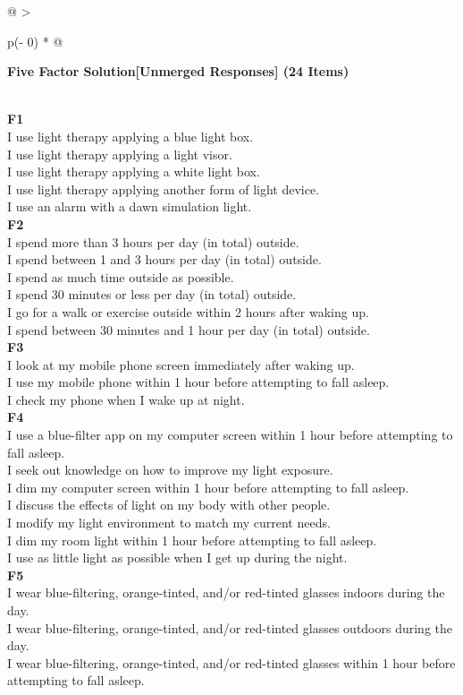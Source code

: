 \begin{appendix}
\begin{longtable}[]{@{}
  >{\raggedright\arraybackslash}p{(\columnwidth - 0\tabcolsep) * }@{}}
\toprule
\begin{minipage}[b]{\linewidth}\raggedright
\textbf{Five Factor Solution{[}Unmerged Responses{]} (24 Items)}
\end{minipage} \\
\midrule
\endhead
\textbf{F1} \\
I use light therapy applying a blue light box. \\
I use light therapy applying a light visor. \\
I use light therapy applying a white light box. \\
I use light therapy applying another form of light device. \\
I use an alarm with a dawn simulation light. \\
\textbf{F2} \\
I spend more than 3 hours per day (in total) outside. \\
I spend between 1 and 3 hours per day (in total) outside. \\
I spend as much time outside as possible. \\
I spend 30 minutes or less per day (in total) outside. \\
I go for a walk or exercise outside within 2 hours after waking up. \\
I spend between 30 minutes and 1 hour per day (in total) outside. \\
\textbf{F3} \\
I look at my mobile phone screen immediately after waking up. \\
I use my mobile phone within 1 hour before attempting to fall asleep. \\
I check my phone when I wake up at night. \\
\textbf{F4} \\
I use a blue-filter app on my computer screen within 1 hour before
attempting to fall asleep. \\
I seek out knowledge on how to improve my light exposure. \\
I dim my computer screen within 1 hour before attempting to fall
asleep. \\
I discuss the effects of light on my body with other people. \\
I modify my light environment to match my current needs. \\
I dim my room light within 1 hour before attempting to fall asleep. \\
I use as little light as possible when I get up during the night. \\
\textbf{F5} \\
I wear blue-filtering, orange-tinted, and/or red-tinted glasses indoors
during the day. \\
I wear blue-filtering, orange-tinted, and/or red-tinted glasses outdoors
during the day. \\
I wear blue-filtering, orange-tinted, and/or red-tinted glasses within 1
hour before attempting to fall asleep. \\
\bottomrule
\end{longtable}


\end{appendix}

